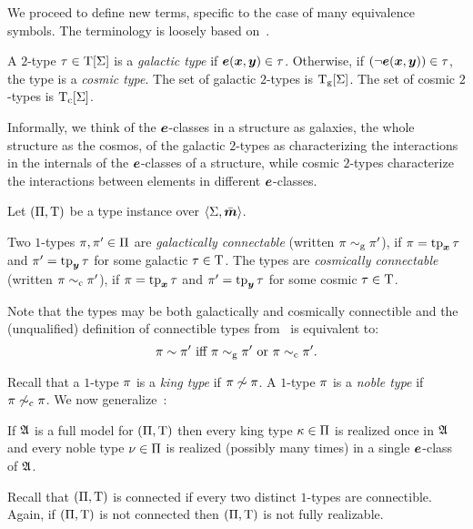 We proceed to define new terms, specific to the case of many equivalence
symbols.
The terminology is loosely based on~\cite{MALQ:MALQ201400102}.

\begin{definition}
A $2$-type $\tau \in \mathrm{T}[\mathrm{\Sigma}]$ is a \emph{galactic type} if $\bm{e}(\bm{x},\bm{y}) \in
\tau$.
Otherwise, if $(\lnot\bm{e}(\bm{x},\bm{y})) \in \tau$, the type is a \emph{cosmic type}.
The set of galactic $2$-types is $\mathrm{T}_{\mathrm{g}}[\mathrm{\Sigma}]$.
The set of cosmic $2$-types is $\mathrm{T}_{\mathrm{c}}[\mathrm{\Sigma}]$.
\end{definition}
Informally, we think of the $\bm{e}$-classes in a structure as galaxies, the
whole structure as the cosmos, of the galactic $2$-types as characterizing the
interactions in the internals of the $\bm{e}$-classes of a structure, while cosmic $2$-types characterize the interactions between elements in different
$\bm{e}$-classes.

Let $(\Pi,\mathrm{T})$ be a type instance over $\left\langle \mathrm{\Sigma},\bar{\bm{m}} \right\rangle$.
\begin{definition}
Two $1$-types $\pi, {\pi'} \in \Pi$ are \emph{galactically connectable}
(written $\pi \sim_{\mathrm{g}} {\pi'}$), if $\pi = \operatorname{tp}_{\bm{x}}\tau$ and ${\pi'} = \operatorname{tp}_{\bm{y}}\tau$
for some galactic $\tau \in \mathrm{T}$.
The types are \emph{cosmically connectable} (written $\pi \sim_{\mathrm{c}} {\pi'}$), if
$\pi = \operatorname{tp}_{\bm{x}}\tau$ and ${\pi'} = \operatorname{tp}_{\bm{y}}\tau$ for some cosmic $\tau \in \mathrm{T}$.
\end{definition}

Note that the types may be both galactically and cosmically connectible and the
(unqualified) definition of connectible types from~ is
equivalent to:
\[\pi \sim {\pi'} \text{ iff } \pi \sim_{\mathrm{g}} {\pi'} \text{ or } \pi \sim_{\mathrm{c}}
{\pi'}.\]

Recall that a $1$-type $\pi$ is a \emph{king type} if $\pi \not\sim \pi$.
A $1$-type $\pi$ is a \emph{noble type} if $\pi \not\sim_{\mathrm{c}} \pi$.
We now generalize~:
\begin{remark}\label{rem:twovar-noble-once}
If $\mathfrak{A}$ is a full model for $(\Pi,\mathrm{T})$ then every king type
$\kappa \in \Pi$ is realized once in $\mathfrak{A}$ and every noble type $\nu \in
\Pi$ is realized (possibly many times) in a single $\bm{e}$-class of $\mathfrak{A}$.
\end{remark}
Recall that $(\Pi,\mathrm{T})$ is connected if every two distinct $1$-types are
connectible. Again, if $(\Pi,\mathrm{T})$ is not connected then $(\Pi,\mathrm{T})$
is not fully realizable.

